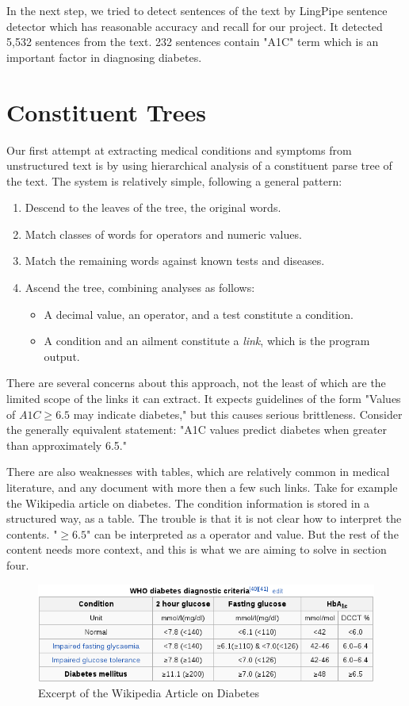 \documentclass[12pt,letterpaper]{article}
\begin{document}
In the next step, we tried to detect sentences of the text by LingPipe sentence detector which has reasonable accuracy and recall for our project. It detected 5,532 sentences from the text. 232 sentences contain "A1C" term which is an important factor in diagnosing diabetes.
   
\section{Constituent Trees}
Our first attempt at extracting medical conditions and symptoms from unstructured text is by using hierarchical analysis of a constituent parse tree of the text. The system is relatively simple, following a general pattern:

\begin{enumerate}
\item Descend to the leaves of the tree, the original words.
\item Match classes of words for operators and numeric values.
\item Match the remaining words against known tests and diseases.
\item Ascend the tree, combining analyses as follows:
\begin{itemize}
	\item A decimal value, an operator, and a test constitute a condition.
	\item A condition and an ailment constitute a \emph{link}, which is the program output.
\end{itemize}
\end{enumerate}

There are several concerns about this approach, not the least of which are the limited scope of the links it can extract. It expects guidelines of the form
"Values of $A1C \geq 6.5$ may indicate diabetes," but this causes serious brittleness. Consider the generally equivalent statement: "A1C values predict diabetes when greater than approximately 6.5."

There are also weaknesses with tables, which are relatively common in medical literature, and any document with more then a few such links. Take for example the Wikipedia article on diabetes. The condition information is stored in a structured way, as a table. The trouble is that it is not clear how to interpret the contents. "$\geq 6.5$" can be interpreted as a operator and value. But the rest of the content needs more context, and this is what we are aiming to solve in section four.
\begin{figure}
\includegraphics[width=\textwidth]{WikipediaA1CTable}
\caption{Excerpt of the Wikipedia Article on Diabetes}
\end{figure}
\end{document}
